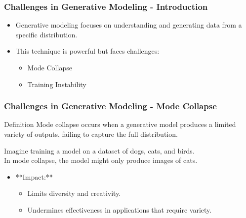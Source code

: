 \documentclass[aspectratio=169]{beamer}
\begin{document}
\begin{frame}[fragile]
    \frametitle{Challenges in Generative Modeling - Introduction}
    \begin{itemize}
        \item Generative modeling focuses on understanding and generating data from a specific distribution.
        \item This technique is powerful but faces challenges:
        \begin{itemize}
            \item Mode Collapse
            \item Training Instability
        \end{itemize}
    \end{itemize}
\end{frame}

\begin{frame}[fragile]
    \frametitle{Challenges in Generative Modeling - Mode Collapse}
    \begin{block}{Definition}
        Mode collapse occurs when a generative model produces a limited variety of outputs, failing to capture the full distribution.
    \end{block}
    
    \begin{example}\vspace{-0.5cm}
        Imagine training a model on a dataset of dogs, cats, and birds.\\
        In mode collapse, the model might only produce images of cats.
    \end{example}
    
    \begin{itemize}
        \item **Impact:**
        \begin{itemize}
            \item Limits diversity and creativity.
            \item Undermines effectiveness in applications that require variety.
        \end{itemize}
    \end{itemize}
\end{frame}
\end{document}
